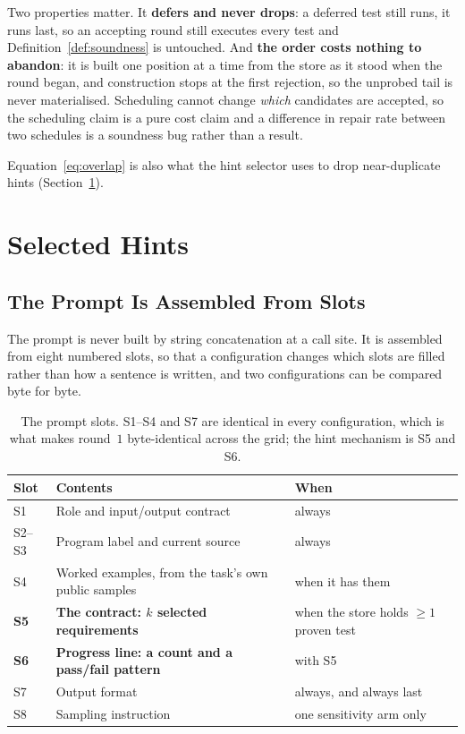 Two properties matter. It \textbf{defers and never drops}: a deferred test
still runs, it runs last, so an accepting round still executes every test and
Definition~\ref{def:soundness} is untouched. And \textbf{the order costs
nothing to abandon}: it is built one position at a time from the store as it
stood when the round began, and construction stops at the first rejection, so
the unprobed tail is never materialised. Scheduling cannot change \emph{which}
candidates are accepted, so the scheduling claim is a pure cost claim and a
difference in repair rate between two schedules is a soundness bug rather than
a result.

Equation~\eqref{eq:overlap} is also what the hint selector uses to drop
near-duplicate hints (Section~\ref{sec:hints}).

\section{Selected Hints}
\label{sec:hints}

\subsection{The Prompt Is Assembled From Slots}

The prompt is never built by string concatenation at a call site. It is
assembled from eight numbered slots, so that a configuration changes which
slots are filled rather than how a sentence is written, and two configurations
can be compared byte for byte.

\begin{table}[htbp]
\centering
\caption{The prompt slots. S1--S4 and S7 are identical in every configuration,
which is what makes round~$1$ byte-identical across the grid; the hint
mechanism is S5 and S6.}
\label{tab:slots}
\small
\begin{tabularx}{\textwidth}{@{}l X l@{}}
\toprule
Slot & Contents & When\\
\midrule
S1 & Role and input/output contract & always\\
S2--S3 & Program label and current source & always\\
S4 & Worked examples, from the task's own public samples & when it has them\\
\textbf{S5} & \textbf{The contract: $k$ selected requirements} & when the store holds $\ge 1$ proven test\\
\textbf{S6} & \textbf{Progress line: a count and a pass/fail pattern} & with S5\\
S7 & Output format & always, and always last\\
S8 & Sampling instruction & one sensitivity arm only\\
\bottomrule
\end{tabularx}
\end{table}

